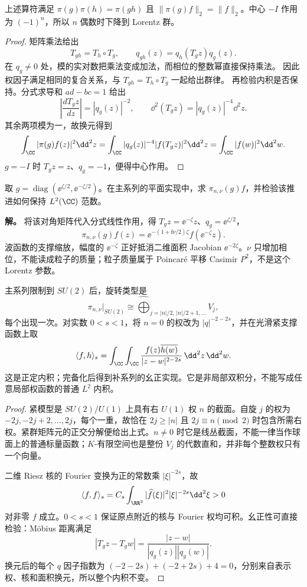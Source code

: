 \begin{proposition}[主系列公式确实给出幺正表示]
上述算符满足 $\pi(g)\pi(h)=\pi(gh)$ 且 $\|\pi(g)f\|_2=\|f\|_2$。中心 $-I$ 作用为 $(-1)^n$，所以 $n$ 偶数时下降到 Lorentz 群。
\end{proposition}
\begin{proof}
矩阵乘法给出
\[
 T_{gh}=T_h\circ T_g,\qquad
 q_{gh}(z)=q_h(T_gz)q_g(z).
\]
在 $q_g\ne0$ 处，模的实对数把乘法变成加法，而相位的整数幂直接保持乘法。
因此权因子满足相同的复合关系，与 $T_{gh}=T_h\circ T_g$ 一起给出群律。
再检验内积是否保持。分式求导和 $ad-bc=1$ 给出
\[
 \left|\frac{dT_gz}{dz}\right|=|q_g(z)|^{-2},\qquad
 \dd^2(T_gz)=|q_g(z)|^{-4}\dd^2z.
\]
其余两项模为一，故换元得到
\[
 \int_{\CC}|\pi(g)f(z)|^2\dd^2z
 =\int_{\CC}|q_g(z)|^{-4}|f(T_gz)|^2\dd^2z
 =\int_{\CC}|f(w)|^2\dd^2w.
\]
$g=-I$ 时 $T_gz=z$、$q_g=-1$，便得中心作用。
\end{proof}

\begin{workedexample}[一个推进对平面波函数的作用]
取 $g=\operatorname{diag}(\ee^{\zeta/2},\ee^{-\zeta/2})$。在主系列的平面实现中，求 $\pi_{n,\nu}(g)f$，并检验该推进如何保持 $L^2(\CC)$ 范数。

\textbf{解。} 将该对角矩阵代入分式线性作用，得 $T_gz=\ee^{-\zeta}z$、$q_g=\ee^{\zeta/2}$，
\[
 \pi_{n,\nu}(g)f(z)=\ee^{-(1+\ii\nu/2)\zeta}f(\ee^{-\zeta}z).
\]
波函数的支撑缩放，幅度的 $\ee^{-\zeta}$ 正好抵消二维面积 Jacobian $\ee^{-2\zeta}$。$\nu$ 只增加相位，不能读成粒子的质量；粒子质量属于 Poincar\'e 平移 Casimir $P^2$，不是这个 Lorentz 参数。
\end{workedexample}

\begin{proposition}[旋转内容与补系列的内积]
主系列限制到 $SU(2)$ 后，旋转类型是
\[
 \pi_{n,\nu}|_{SU(2)}\cong\widehat{\bigoplus}_{j=|n|/2,\,|n|/2+1,\ldots}V_j,
\]
每个出现一次。对实数 $0<s<1$，将 $n=0$ 的权改为 $|q|^{-2-2s}$，并在光滑紧支撑函数上取
\[
 \langle f,h\rangle_s
 =\int_{\CC}\int_{\CC}
 \frac{f(z)\overline{h(w)}}{|z-w|^{2-2s}}\,\dd^2z\,\dd^2w.
\]
这是正定内积；完备化后得到补系列的幺正实现。它是非局部双积分，不能写成任意局部权函数的普通 $L^2$ 内积。
\end{proposition}
\begin{proof}
紧模型是 $SU(2)/U(1)$ 上具有右 $U(1)$ 权 $n$ 的截面。自旋 $j$ 的权为 $-2j,-2j+2,\ldots,2j$，每个一重，故恰在 $2j\ge|n|$ 且 $2j\equiv n\pmod2$ 时包含所需右权。紧群矩阵元的正交分解便给出上式。$n\ne0$ 时它是线丛截面，不能一律当作球面上的普通标量函数；$K$-有限空间也是整份 $V_j$ 的代数直和，并非每个整数权只有一个向量。

二维 Riesz 核的 Fourier 变换为正的常数乘 $|\xi|^{-2s}$，故
\[
 \langle f,f\rangle_s=C_s\int_{\RR^2}|\widehat f(\xi)|^2|\xi|^{-2s}\dd^2\xi>0
\]
对非零 $f$ 成立。$0<s<1$ 保证原点附近的核与 Fourier 权均可积。幺正性可直接检验：M\"obius 距离满足
\[
 |T_gz-T_gw|=\frac{|z-w|}{|q_g(z)||q_g(w)|}.
\]
换元后的每个 $q$ 因子指数为 $(-2-2s)+(-2+2s)+4=0$，分别来自表示权、核和面积换元，所以整个内积不变。
\end{proof}

